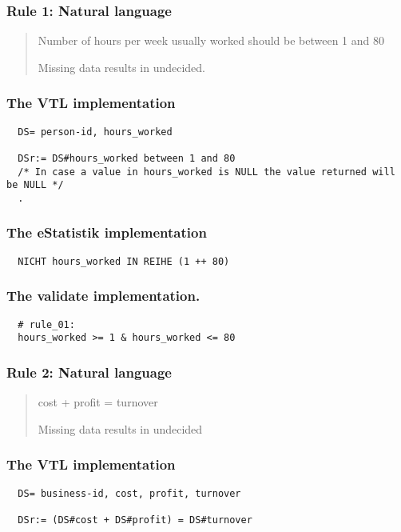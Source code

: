 
\subsubsection*{  Rule 1: Natural language}
\begin{quote}


Number of hours per week usually worked should be between 1 and 80

Missing data results in undecided.


\end{quote}
\subsubsection*{The VTL implementation}
\begin{verbatim}
  DS= person-id, hours_worked

  DSr:= DS#hours_worked between 1 and 80
  /* In case a value in hours_worked is NULL the value returned will be NULL */
  .
\end{verbatim}
\subsubsection*{The eStatistik implementation}
\begin{verbatim}
  NICHT hours_worked IN REIHE (1 ++ 80)
\end{verbatim}
\subsubsection*{The validate implementation.}
\begin{verbatim}
  # rule_01:
  hours_worked >= 1 & hours_worked <= 80
\end{verbatim}


\newpage

\subsubsection*{  Rule 2: Natural language}
\begin{quote}


cost + profit = turnover

Missing data results in undecided



\end{quote}
\subsubsection*{The VTL implementation}
\begin{verbatim}
  DS= business-id, cost, profit, turnover

  DSr:= (DS#cost + DS#profit) = DS#turnover
\end{verbatim}
